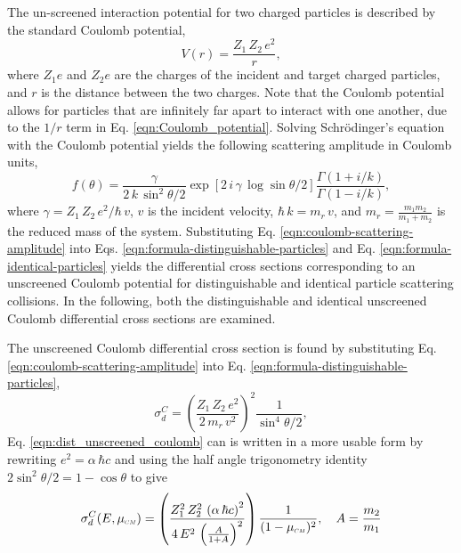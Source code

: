 The un-screened interaction potential for two charged particles is described by the standard Coulomb potential,
\begin{equation} \label{eqn:Coulomb_potential}
    V(r) = \dfrac{Z_1 \, Z_2 \, e^2}{r},
\end{equation}
where $Z_1 e$ and $Z_2 e$ are the charges of the incident and target charged particles, and $r$ is the distance between the two charges. Note that the Coulomb potential allows for particles that are infinitely far apart to interact with one another, due to the $1/r$ term in Eq. \eqref{eqn:Coulomb_potential}. Solving Schr\"{o}dinger's equation with the Coulomb potential yields the following scattering amplitude in Coulomb units,
\begin{equation} \label{eqn:coulomb-scattering-amplitude}
    f(\theta) = \dfrac{\gamma}{2 \, k \, \sin^2 \theta/2} \exp \left[ 2 \, i \, \gamma \, \log \sin \theta/2 \right] \dfrac{\Gamma(1 + i/k)}{\Gamma(1 - i/k)},
\end{equation}
where $\gamma = Z_1 \, Z_2 \, e^2 / \hbar \, v$, $v$ is the incident velocity, $\hbar \, k = m_r \, v$, and $m_r = \frac{m_1 m_2}{m_1 + m_2}$ is the reduced mass of the system. Substituting Eq. \eqref{eqn:coulomb-scattering-amplitude} into Eqs. \eqref{eqn:formula-distinguishable-particles} and Eq. \eqref{eqn:formula-identical-particles} yields the differential cross sections corresponding to an unscreened Coulomb potential for distinguishable and identical particle scattering collisions. In the following, both the distinguishable and identical unscreened Coulomb differential cross sections are examined.

The unscreened Coulomb differential cross section is found by substituting Eq. \eqref{eqn:coulomb-scattering-amplitude} into Eq. \eqref{eqn:formula-distinguishable-particles},
\begin{equation} \label{eqn:dist_unscreened_coulomb}
    \sigma_{d}^{C} = \left(\dfrac{Z_1 \, Z_2 \, e^2}{2 \, m_r \, v^2}\right)^2 \dfrac{1}{\sin^4 \theta/2},
\end{equation}
Eq. \eqref{eqn:dist_unscreened_coulomb} can is written in a more usable form by rewriting $e^2 = \alpha \, \hbar c$ and using the half angle trigonometry identity $2 \sin^2 \theta / 2 = 1 - \cos \theta$ to give
\begin{equation} \label{eqn:coulomb-dcs}
    \sigma_{d}^{C}(E,\mucm) = \left(\dfrac{Z_1^2 \, Z_2^2 \, \left(\alpha \, \hbar c\right)^2}{ 4 \, E^2 \, \left(\frac{A}{1 + A} \right)^2}\right) \dfrac{1}{(1 - \mucm)^2}, \quad A = \dfrac{m_2}{m_1}
\end{equation}

